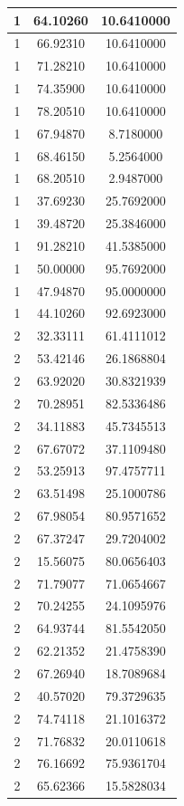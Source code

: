 \documentclass[
]{book}
\begin{document}
\begin{tabular}{c|c|c}
\hline
1 & 64.10260 & 10.6410000\\
\hline
1 & 66.92310 & 10.6410000\\
\hline
1 & 71.28210 & 10.6410000\\
\hline
1 & 74.35900 & 10.6410000\\
\hline
1 & 78.20510 & 10.6410000\\
\hline
1 & 67.94870 & 8.7180000\\
\hline
1 & 68.46150 & 5.2564000\\
\hline
1 & 68.20510 & 2.9487000\\
\hline
1 & 37.69230 & 25.7692000\\
\hline
1 & 39.48720 & 25.3846000\\
\hline
1 & 91.28210 & 41.5385000\\
\hline
1 & 50.00000 & 95.7692000\\
\hline
1 & 47.94870 & 95.0000000\\
\hline
1 & 44.10260 & 92.6923000\\
\hline
2 & 32.33111 & 61.4111012\\
\hline
2 & 53.42146 & 26.1868804\\
\hline
2 & 63.92020 & 30.8321939\\
\hline
2 & 70.28951 & 82.5336486\\
\hline
2 & 34.11883 & 45.7345513\\
\hline
2 & 67.67072 & 37.1109480\\
\hline
2 & 53.25913 & 97.4757711\\
\hline
2 & 63.51498 & 25.1000786\\
\hline
2 & 67.98054 & 80.9571652\\
\hline
2 & 67.37247 & 29.7204002\\
\hline
2 & 15.56075 & 80.0656403\\
\hline
2 & 71.79077 & 71.0654667\\
\hline
2 & 70.24255 & 24.1095976\\
\hline
2 & 64.93744 & 81.5542050\\
\hline
2 & 62.21352 & 21.4758390\\
\hline
2 & 67.26940 & 18.7089684\\
\hline
2 & 40.57020 & 79.3729635\\
\hline
2 & 74.74118 & 21.1016372\\
\hline
2 & 71.76832 & 20.0110618\\
\hline
2 & 76.16692 & 75.9361704\\
\hline
2 & 65.62366 & 15.5828034\\

\end{tabular}
\end{document}

